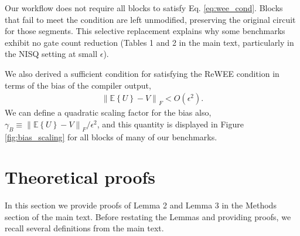 \documentclass[fleqn,10pt]{wlscirep}
\newcommand{\normf}[1]{\left\lVert #1 \right\rVert_F}
\newcommand{\E}[1]{\mathbb{E}\left\{ #1 \right\}}
\begin{document}
Our workflow does not require all blocks to satisfy Eq. \eqref{eq:wee_cond}. Blocks that fail to meet the condition are left unmodified, preserving the original circuit for those segments.  
This selective replacement explains why some benchmarks exhibit no gate count reduction (Tables 1 and 2 in the main text, particularly in the NISQ setting at small $\epsilon$). 

We also derived a sufficient condition for satisfying the ReWEE condition in terms of the bias of the compiler output,
\begin{align}
    \normf{\E{U} - V} < O(\epsilon^2).
\end{align}
We can define a quadratic scaling factor for the bias also, $\gamma_B \equiv \normf{\E{U}-V}/\epsilon^2$, and this quantity is displayed in Figure \ref{fig:bias_scaling} for all blocks of many of our benchmarks.


\section{Theoretical proofs}
In this section we provide proofs of Lemma 2 and Lemma 3 in the Methods section of the main text. Before restating the Lemmas and providing proofs, we recall several definitions from the main text.
\end{document}
